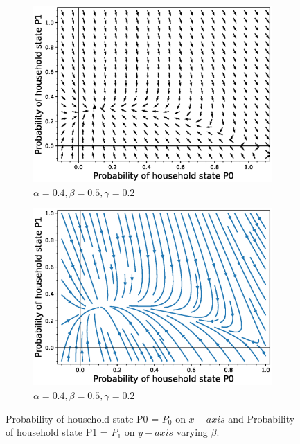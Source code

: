 \documentclass[paper=a4, fontsize=11pt, twoside, BCOR=12mm, parskip=full, listof=totoc]{scrreprt}
\begin{document}
{\begin{figure}[H]
\begin{subfigure}[b]{0.4\linewidth}
	  \includegraphics[width=\linewidth]{phase_portrait/042_g16.eps}
	  \caption{\(\alpha=0.4, \beta=0.5, \gamma=0.2\)}
	  \label{beta five phasevectorfield}
	\end{subfigure}
	\begin{subfigure}[b]{0.4\linewidth}
	  \includegraphics[width=\linewidth]{phase_portrait/042_g16s.eps}
	  \caption{\(\alpha=0.4, \beta=0.5, \gamma=0.2\)}
	  \label{beta five phasestreamplot}
	\end{subfigure}
	\caption{Probability of household state P0 = $P_0$ on $x-axis$ and Probability of household state P1 = $P_1$ on $y-axis$ varying $\beta$.}
	\label{plot of vector fields of $P_0$ on x axis and $P_1$ on y axis for beta}
\end{figure}


}
\end{document}
